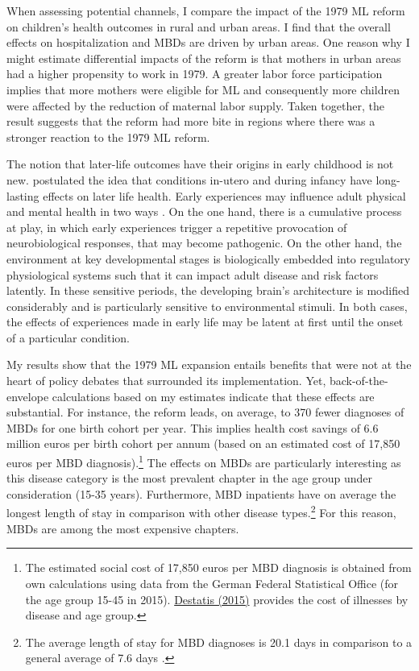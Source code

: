 \documentclass[11pt, a4paper, draft]{article} %
\begin{document}
When assessing potential channels, I compare the impact of the 1979 ML reform on children's health outcomes in rural and urban areas. I find that the overall effects on hospitalization and MBDs are driven by urban areas. One reason why I might estimate differential impacts of the reform is that mothers in urban areas had a higher propensity to work in 1979. A greater labor force participation implies that more mothers were eligible for ML and consequently more children were affected by the reduction of maternal labor supply. Taken together, the result suggests that the reform had more bite in regions where there was a stronger reaction to the 1979 ML reform. 



The notion that later-life outcomes have their origins in early childhood is not new. \cite{Barker1990origins} postulated the idea that conditions in-utero and during infancy have long-lasting effects on later life health. Early experiences may influence adult physical and mental health in two ways \citep{shonkoff2009neuroscience}. On the one hand, there is a cumulative process at play, in which early experiences trigger a repetitive provocation of neurobiological responses, that may become pathogenic. On the other hand, the environment at key developmental stages is biologically embedded into regulatory physiological systems such that it can impact adult disease and risk factors latently. In these sensitive periods, the developing brain's architecture is modified considerably and is particularly sensitive to environmental stimuli. In both cases, the effects of experiences made in early life may be latent at first until the onset of a particular condition.


My results show that the 1979 ML expansion entails benefits that were not at the heart of policy debates that surrounded its implementation. Yet, back-of-the-envelope calculations based on my estimates indicate that these effects are substantial. For instance, the reform leads, on average, to 370 fewer diagnoses of MBDs for one birth cohort per year. This implies health cost savings of 6.6 million euros per birth cohort per annum (based on an estimated cost of 17,850 euros per MBD diagnosis).\footnote{The estimated social cost of 17,850 euros per MBD diagnosis is obtained from own calculations using data from the German Federal Statistical Office (for the age group 15-45 in 2015). \href{https://www.destatis.de/EN/Themes/Society-Environment/Health/Cost-Illness/Tables/disease-categories-age.html}{Destatis (2015)} provides the cost of illnesses by disease and age group.} The effects on MBDs are particularly interesting as this disease category is the most prevalent chapter in the age group under consideration (15-35 years). Furthermore, MBD inpatients have on average the longest length of stay in comparison with other disease types.\footnote{The average length of stay for MBD diagnoses is 20.1 days in comparison to a general average of 7.6 days \cite[p. 5]{statistisches2012diagnosedaten}.} For this reason, MBDs are among the most expensive chapters.
\end{document}
